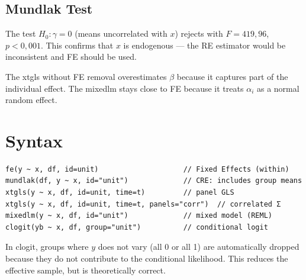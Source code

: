 \subsection*{Mundlak Test}

The test $H_0: \gamma = 0$ (means uncorrelated with $x$) rejects with
$F = 419{,}96$, $p < 0{,}001$. This confirms that $x$ is endogenous — the
RE estimator would be inconsistent and FE should be used.

The xtgls without FE removal overestimates $\beta$ because it captures part of the
individual effect. The mixedlm stays close to FE because it treats $\alpha_i$ as a
normal random effect.

\section{Syntax}

\begin{lstlisting}
fe(y ~ x, df, id=unit)                    // Fixed Effects (within)
mundlak(df, y ~ x, id="unit")             // CRE: includes group means
xtgls(y ~ x, df, id=unit, time=t)         // panel GLS
xtgls(y ~ x, df, id=unit, time=t, panels="corr")  // correlated Σ
mixedlm(y ~ x, df, id="unit")             // mixed model (REML)
clogit(yb ~ x, df, group="unit")          // conditional logit
\end{lstlisting}

\begin{nota}
  In clogit, groups where $y$ does not vary (all 0 or all 1) are
  automatically dropped because they do not contribute to the conditional
  likelihood. This reduces the effective sample, but is theoretically correct.
\end{nota}
